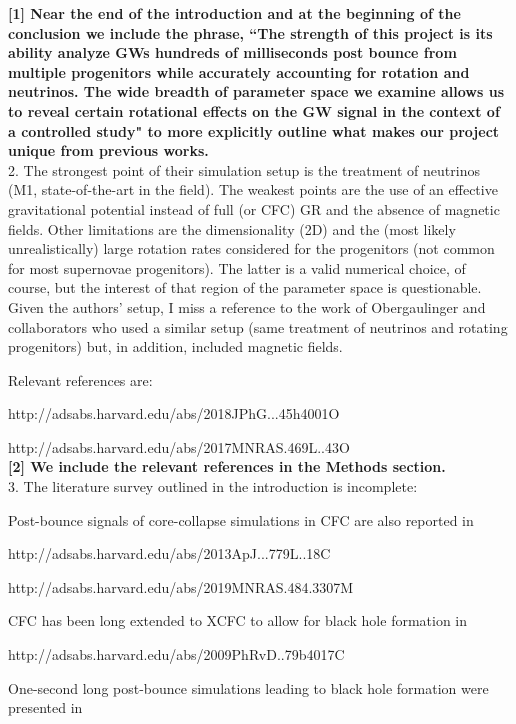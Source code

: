 \documentclass[11pt]{article}
\begin{document}
\textbf{[1] Near the end of the introduction and at the beginning of the conclusion we include the phrase, ``The strength of this project is its ability analyze GWs hundreds of milliseconds post bounce from multiple progenitors while accurately accounting for rotation and neutrinos.  The wide breadth of parameter space we examine allows us to reveal certain rotational effects on the GW signal in the context of a controlled study" to more explicitly outline what makes our project unique from previous works.}\\


2. The strongest point of their simulation setup is the treatment of neutrinos 
(M1, state-of-the-art in the field). The weakest points are the use of an 
effective gravitational potential instead of full (or CFC) GR and the absence of 
magnetic fields. Other limitations are the dimensionality (2D) and the (most likely unrealistically) large rotation rates considered for the progenitors (not common for most supernovae progenitors). The latter is a valid numerical choice, of course, but the interest of that region of the parameter space is questionable.\\

Given the authors' setup, I miss a reference to the work of Obergaulinger and
collaborators who used a similar setup (same treatment of neutrinos and rotating progenitors) but, in addition, included magnetic fields.

Relevant references are:

http://adsabs.harvard.edu/abs/2018JPhG...45h4001O

http://adsabs.harvard.edu/abs/2017MNRAS.469L..43O\\

\textbf{[2] We include the relevant references in the Methods section.}\\

3. The literature survey outlined in the introduction is incomplete:

Post-bounce signals of core-collapse simulations in CFC are also reported in

http://adsabs.harvard.edu/abs/2013ApJ...779L..18C

http://adsabs.harvard.edu/abs/2019MNRAS.484.3307M

CFC has been long extended to XCFC to allow for black hole formation in

http://adsabs.harvard.edu/abs/2009PhRvD..79b4017C

One-second long post-bounce simulations leading to black hole formation were
presented in 
\end{document}
